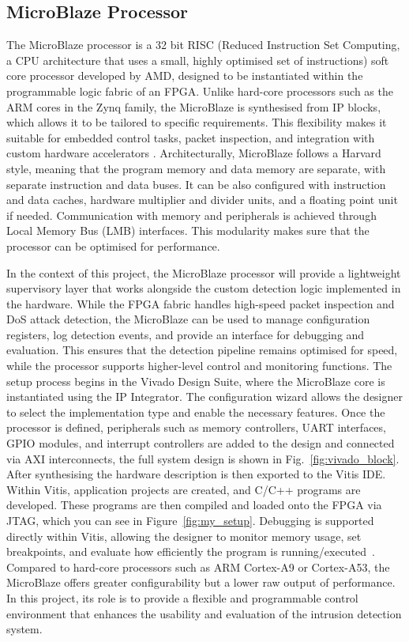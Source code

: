 \subsection{MicroBlaze Processor}
The MicroBlaze processor is a 32 bit RISC (Reduced Instruction Set Computing, a CPU architecture that uses a small, highly optimised set of instructions) soft core processor developed by AMD, designed to be instantiated within the programmable logic fabric of an FPGA. Unlike hard-core processors such as the ARM cores in the Zynq family, the MicroBlaze is synthesised from IP blocks, which allows it to be tailored to specific requirements. This flexibility makes it suitable for embedded control tasks, packet inspection, and integration with custom hardware accelerators \cite{noauthor_introduction_nodate,noauthor_designing_nodate}. Architecturally, MicroBlaze follows a Harvard style, meaning that the program memory and data memory are separate, with separate instruction and data buses. It can be also configured with instruction and data caches, hardware multiplier and divider units, and a floating point unit if needed. Communication with memory and peripherals is achieved through Local Memory Bus (LMB) interfaces. This modularity makes sure that the processor can be optimised for performance. 
\par
In the context of this project, the MicroBlaze processor will provide a lightweight supervisory layer that works alongside the custom detection logic implemented in the hardware. While the FPGA fabric handles high-speed packet inspection and DoS attack detection, the MicroBlaze can be used to manage configuration registers, log detection events, and provide an interface for debugging and evaluation. This ensures that the detection pipeline remains optimised for speed, while the processor supports higher-level control and monitoring functions. The setup process begins in the Vivado Design Suite, where the MicroBlaze core is instantiated using the IP Integrator. The configuration wizard allows the designer to select the implementation type and enable the necessary features. Once the processor is defined, peripherals such as memory controllers, UART interfaces, GPIO modules, and interrupt controllers are added to the design and connected via AXI interconnects, the full system design is shown in Fig.~\ref{fig:vivado_block}. After synthesising the hardware description is then exported to the Vitis IDE. Within Vitis, application projects are created, and C/C++ programs are developed. These programs are then compiled and loaded onto the FPGA via JTAG, which you can see in Figure~\ref{fig:my_setup}. Debugging is supported directly within Vitis, allowing the designer to monitor memory usage, set breakpoints, and evaluate how efficiently the program is running/executed~\cite{noauthor_getting_nodate}. Compared to hard-core processors such as ARM Cortex-A9 or Cortex-A53, the MicroBlaze offers greater configurability but a lower raw output of performance. In this project, its role is to provide a flexible and programmable control environment that enhances the usability and evaluation of the intrusion detection system.



